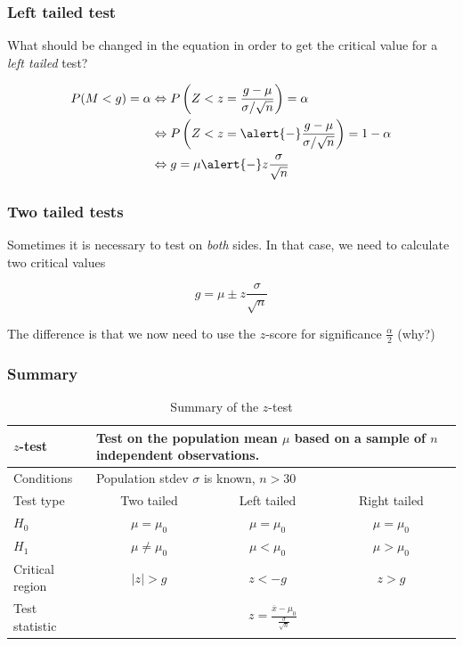 \documentclass{beamer}
\begin{document}
\begin{frame}
  \frametitle{Left tailed test}
  
  What should be changed in the equation in order to get the critical value for a \emph{left tailed} test?
  
  \pause

  \begin{equation*}
\begin{split}
P(M < g) = \alpha & \Leftrightarrow P\left(Z< z=\frac{g-\mu}{\sigma/\sqrt{n}}\right) = \alpha\\
& \Leftrightarrow P\left(Z < z = \alert{-}\frac{g-\mu}{\sigma/\sqrt{n}}\right) = 1-\alpha\\
& \Leftrightarrow g = \mu \alert{-} z \frac{\sigma}{\sqrt{n}}
\end{split}
\end{equation*}

\end{frame}

\begin{frame}
  \frametitle{Two tailed tests}
  
  Sometimes it is necessary to test on \emph{both} sides. In that case, we need to calculate two critical values

\begin{equation}
  g = \mu \pm z \frac{\sigma}{\sqrt{n}}
  \label{eq:kritiekeGrenswaarde}
\end{equation}

The difference is that we now need to use the $z$-score for significance $\frac{\alpha}{2}$ (why?)
\end{frame}

\begin{frame}
  \frametitle{Summary}

\begin{table}
  \centering
  \begin{tabular}{l|ccc}
    \toprule
    $z$-test              & \multicolumn{3}{l}{\parbox{.7\textwidth}{Test on the population mean $\mu$ based on a sample of $n$ independent observations.}} \\
    \midrule
    Conditions        & \multicolumn{3}{l}{\parbox{.7\textwidth}{Population stdev $\sigma$ is known, $n>30$}} \\
    \midrule
    Test type         & Two tailed           & Left tailed & Right tailed \\
    \midrule
    $H_{0}$           & $\mu = \mu_{0}$      & $\mu = \mu_{0}$ & $\mu = \mu_{0}$  \\
    $H_{1}$           & $\mu \neq \mu_{0}$   & $\mu < \mu_{0}$ & $\mu > \mu_{0}$  \\
    Critical region   & $\left|z\right| > g$ & $z< -g $        & $z>g$            \\
    Test statistic    & \multicolumn{3}{c}{$z = \frac{\overline{x} - \mu_{0}}{\frac{\sigma}{\sqrt{n}}}$} \\
    \bottomrule
  \end{tabular}
  \caption{Summary of the $z$-test}
  \label{tab:toetsingsprocedures}
\end{table}
\end{frame}
\end{document}
